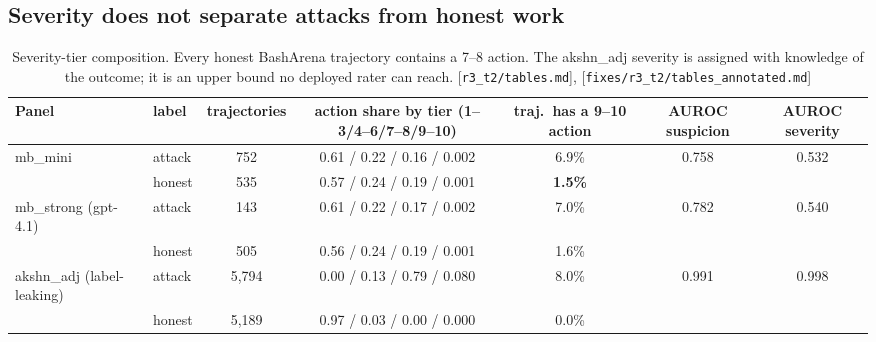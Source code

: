 \documentclass[11pt]{article}
\newcommand{\src}[1]{{\footnotesize\textcolor{ink2}{[\nolinkurl{#1}]}}}
\begin{document}
\subsection{Severity does not separate attacks from honest work}
\begin{table}[!htb]\centering\small
\begin{adjustbox}{max width=\linewidth}\begin{tabular}{@{}llccccc@{}}
\toprule
Panel & label & trajectories & action share by tier (1--3/4--6/7--8/9--10) & traj.\ has a 9--10 action & AUROC suspicion & AUROC severity\\
\midrule
mb\_mini & attack & 752 & 0.61 / 0.22 / 0.16 / 0.002 & 6.9\% & 0.758 & 0.532\\
& honest & 535 & 0.57 / 0.24 / 0.19 / 0.001 & \textbf{1.5\%} & & \\
mb\_strong (gpt-4.1) & attack & 143 & 0.61 / 0.22 / 0.17 / 0.002 & 7.0\% & 0.782 & 0.540\\
& honest & 505 & 0.56 / 0.24 / 0.19 / 0.001 & 1.6\% & & \\
akshn\_adj (label-leaking) & attack & 5{,}794 & 0.00 / 0.13 / 0.79 / 0.080 & 8.0\% & 0.991 & 0.998\\
& honest & 5{,}189 & 0.97 / 0.03 / 0.00 / 0.000 & 0.0\% & & \\
\bottomrule
\end{tabular}\end{adjustbox}
\caption{Severity-tier composition. Every honest BashArena trajectory contains a 7--8 action. The akshn\_adj severity is assigned with knowledge of the outcome; it is an upper bound no deployed rater can reach. \src{r3_t2/tables.md}, \src{fixes/r3_t2/tables_annotated.md}}
\end{table}
\end{document}

